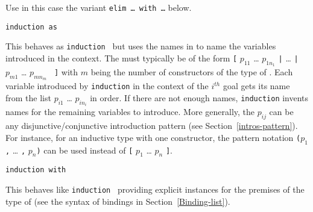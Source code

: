 \begin{coq_example*}
\begin{ErrMsgs}
\item {}
\item {}

  Use in this case
  the variant {\tt elim \dots\ with \dots} below.
\end{ErrMsgs}

\begin{Variants}
\item{\tt induction {\term} as {\disjconjintropattern}}

  This behaves as {\tt induction {\term}} but uses the names in
  {\disjconjintropattern} to name the variables introduced in the context.
  The {\disjconjintropattern} must typically be of the form
  {\tt [} $p_{11}$ {\ldots}
  $p_{1n_1}$ {\tt |} {\ldots} {\tt |} $p_{m1}$ {\ldots} $p_{mn_m}$ {\tt
    ]} with $m$ being the number of constructors of the type of
  {\term}. Each variable introduced by {\tt induction} in the context
  of the $i^{th}$ goal gets its name from the list $p_{i1}$ {\ldots}
  $p_{in_i}$ in order. If there are not enough names, {\tt induction}
  invents names for the remaining variables to introduce. More
  generally, the $p_{ij}$ can be any disjunctive/conjunctive
  introduction pattern (see Section~\ref{intros-pattern}). For instance,
  for an inductive type with one constructor, the pattern notation
  {\tt (}$p_{1}$ {\tt ,} {\ldots} {\tt ,} $p_{n}${\tt )} can be used instead of
  {\tt [} $p_{1}$ {\ldots} $p_{n}$ {\tt ]}.





\item{\tt induction {\term} with \bindinglist}

  This behaves like \texttt{induction {\term}} providing explicit
  instances for the premises of the type of {\term} (see the syntax of
  bindings in Section~\ref{Binding-list}).


\end{Variants}
\end{coq_example*}
